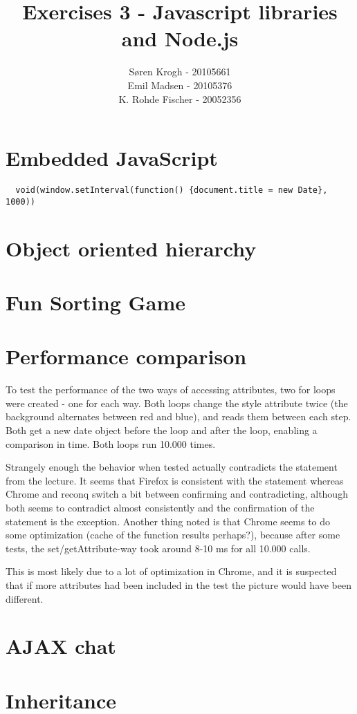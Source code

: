 \documentclass[a4paper,10pt]{article}
\author{
Søren Krogh -  20105661 \\
Emil Madsen - 20105376  \\
K. Rohde Fischer - 20052356\\}
\title{Exercises 3 - Javascript libraries and Node.js}
\begin{document}
\maketitle

\section*{Embedded JavaScript}

\begin{verbatim}
  void(window.setInterval(function() {document.title = new Date}, 1000))
\end{verbatim}


\section*{Object oriented hierarchy}

\section*{Fun Sorting Game}

\section*{Performance comparison}
To test the performance of the two ways of accessing attributes, two
for loops were created - one for each way.  Both loops change the
style attribute twice (the background alternates between red and
blue), and reads them between each step.  Both get a new date object
before the loop and after the loop, enabling a comparison in time.
Both loops run 10.000 times.

Strangely enough the behavior when tested actually contradicts the
statement from the lecture.  It seems that Firefox is consistent with
the statement whereas Chrome and reconq switch a bit between
confirming and contradicting, although both seems to contradict almost
consistently and the confirmation of the statement is the exception.
Another thing noted is that Chrome seems to do some optimization
(cache of the function results perhaps?), because after some tests,
the set/getAttribute-way took around 8-10 ms for all 10.000 calls.

This is most likely due to a lot of optimization in Chrome, and it is
suspected that if more attributes had been included in the test the
picture would have been different.

\section*{AJAX chat}

\section*{Inheritance}
\end{document}
